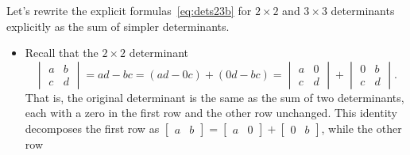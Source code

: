 \begin{example} 
Let's rewrite the explicit formulas~\eqref{eq:dets23b} for \(2\times2\) and \(3\times3\) determinants explicitly as the sum of simpler determinants.
\begin{itemize}
\item Recall that the \(2\times2\) determinant
\begin{equation*}
\begin{vmatrix} a&b\\c&d \end{vmatrix}
=ad-bc
=(ad-0c)+(0d-bc)
=\begin{vmatrix} a&0\\c&d \end{vmatrix}
+\begin{vmatrix} 0&b\\c&d \end{vmatrix}.
\end{equation*}
That is, the original determinant is the same as the sum of two determinants, each with a zero in the first row and the other row unchanged.
This identity decomposes the first row as \(\begin{bmatrix} a&b \end{bmatrix}=\begin{bmatrix} a&0 \end{bmatrix}+\begin{bmatrix} 0&b \end{bmatrix}\), while the other row 


\end{itemize}
\end{example}
